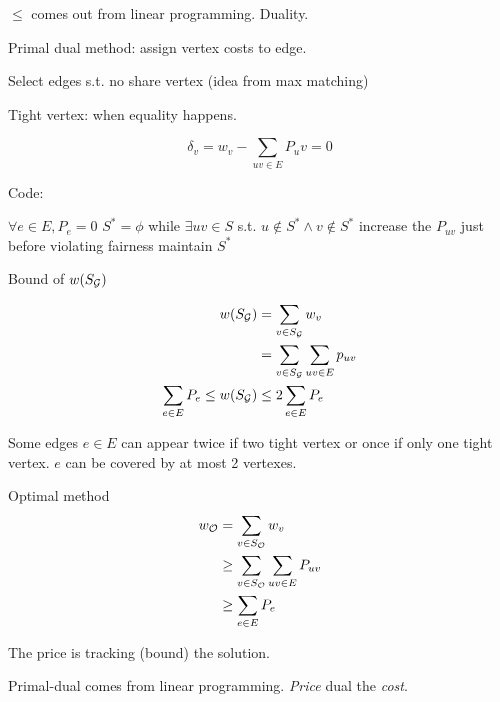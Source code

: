 \documentclass[a4paper]{report}
\theoremstyle{definition}
\begin{document}
$\leq$ comes out from linear programming. Duality. 

Primal dual method: assign vertex costs to edge. 

Select edges s.t. no share vertex (idea from max matching)

Tight vertex: when equality happens. 

$$\delta_v = w_v -\sum_{uv\in E}P_uv=0$$

Code:
\begin{python}[mathescape]
$\forall e\in E, P_e=0$
$S^*=\phi$
while $\exists uv\in S$ s.t. $u\notin S^* \wedge v\notin S^*$
  increase the $P_{uv}$ just before violating fairness
  maintain $S^*$
\end{python}

Bound of $w(S_{\mathcal{G}})$

\begin{align*}
w(S_{\mathcal{G}}) &= \sum_{v\in S_{\mathcal{G}}} w_v\\
&= \sum_{v\in S_{\mathcal{G}}}\sum_{uv\in E} p_{uv}\\
\sum_{e\in E} P_e \leq w(S_{\mathcal{G}}) &\leq 2\sum_{e\in E}P_e \\
\end{align*}

Some edges $e\in E$ can appear twice if two tight vertex or once if only one tight vertex. $e$ can be covered by at most 2 vertexes. 

Optimal method 
\begin{align*}
w_{\mathcal{O}} &= \sum_{v\in S_{\mathcal{O}}} w_v \\
&\geq \sum_{v\in S_{\mathcal{O}}} \sum_{uv\in E}P_{uv} \\
&\geq \sum_{e\in E} P_e
\end{align*}

The price is tracking (bound) the solution.

Primal-dual comes from linear programming. \textit{Price} dual the \textit{cost}. 
\end{document}
